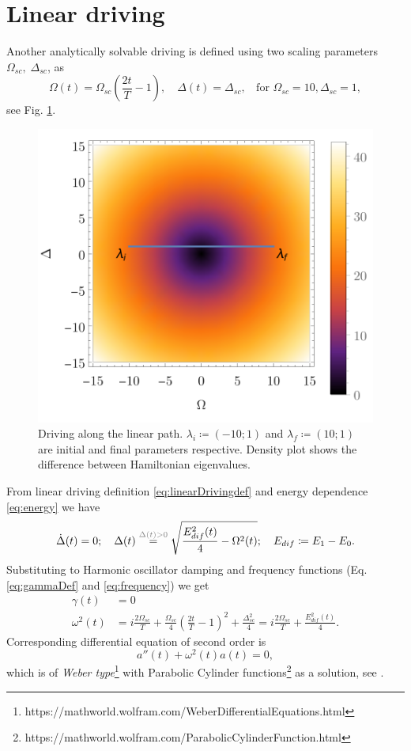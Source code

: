 \newpage 
\section{Linear driving}
Another analytically solvable driving is defined using two scaling parameters $\Omega_{sc},\;\Delta_{sc}$, as 
\begin{equation}
    \Omega(t)=\Omega_{sc}\left(\frac{2t}{T}-1\right),\quad \Delta(t)=\Delta_{sc}, \;\;\text{ for } \Omega_{sc}=10, \Delta_{sc}=1,
    \label{eq:linearDrivingdef}
\end{equation}
see Fig. \ref{fig:driving1}. 
\begin{figure}[H]
    \centering
    \includegraphics[scale=1.2]{../img/drivingLin.pdf}
    \caption{Driving along the linear path. $\lambda_i\coloneqq(-10;1)$ and $\lambda_f\coloneqq(10;1)$ are initial and final parameters respective. Density plot shows the difference between Hamiltonian eigenvalues.}
    \label{fig:driving1}
\end{figure}

From linear driving definition \ref{eq:linearDrivingdef} and energy dependence \ref{eq:energy} we have
\begin{equation}
    \dot \Delta(t)=0;\quad \Delta(t) \overset{\textcolor{gray}{\Delta(t)>0}}{=} \sqrt{\frac{E^2_{dif}(t)}{4}-\Omega^2(t)};\quad E_{dif}\coloneqq E_1-E_0.
\end{equation}
Substituting to Harmonic oscillator damping and frequency functions (Eq. \ref{eq:gammaDef} and \ref{eq:frequency}) we get 
\begin{align}
    \gamma(t) &= 0\\
    \omega^2(t)&=i\frac{2\Omega_{sc}}{T}+\frac{\Omega_{sc}}{4}\left(\frac{2t}{T}-1\right)^2+\frac{\Delta_{sc}^2}{4}=i\frac{2\Omega_{sc}}{T}+\frac{E^2_{dif}(t)}{4}.
    \label{eq:oscillationsLinear}
\end{align}
Corresponding differential equation of second order is
\begin{equation}
    a''(t)+\omega^2(t) a(t)=0,
\end{equation}
which is of \emph{Weber type}\footnote{https://mathworld.wolfram.com/WeberDifferentialEquations.html} with Parabolic Cylinder functions\footnote{https://mathworld.wolfram.com/ParabolicCylinderFunction.html} as a solution, see \cite{felipe}. 

